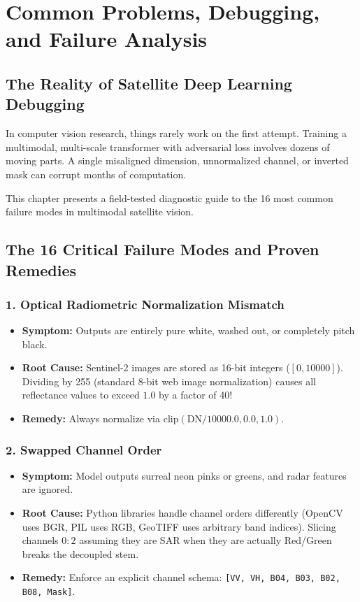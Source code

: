 \chapter{Common Problems, Debugging, and Failure Analysis}
\label{chap:ch19}

\section{The Reality of Satellite Deep Learning Debugging}
In computer vision research, things rarely work on the first attempt. Training a multimodal, multi-scale transformer with adversarial loss involves dozens of moving parts. A single misaligned dimension, unnormalized channel, or inverted mask can corrupt months of computation.

This chapter presents a field-tested diagnostic guide to the 16 most common failure modes in multimodal satellite vision.

\section{The 16 Critical Failure Modes and Proven Remedies}

\subsection{1. Optical Radiometric Normalization Mismatch}
\begin{itemize}
    \item \textbf{Symptom:} Outputs are entirely pure white, washed out, or completely pitch black.
    \item \textbf{Root Cause:} Sentinel-2 images are stored as 16-bit integers ($[0, 10000]$). Dividing by 255 (standard 8-bit web image normalization) causes all reflectance values to exceed $1.0$ by a factor of 40!
    \item \textbf{Remedy:} Always normalize via $\text{clip}(\text{DN} / 10000.0, 0.0, 1.0)$.
\end{itemize}

\subsection{2. Swapped Channel Order}
\begin{itemize}
    \item \textbf{Symptom:} Model outputs surreal neon pinks or greens, and radar features are ignored.
    \item \textbf{Root Cause:} Python libraries handle channel orders differently (OpenCV uses BGR, PIL uses RGB, GeoTIFF uses arbitrary band indices). Slicing channels $0:2$ assuming they are SAR when they are actually Red/Green breaks the decoupled stem.
    \item \textbf{Remedy:} Enforce an explicit channel schema: \texttt{[VV, VH, B04, B03, B02, B08, Mask]}.
\end{itemize}

